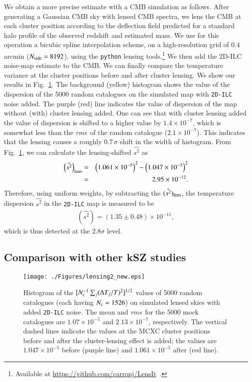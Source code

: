 \documentclass[traditabstract, longauth]{aa}
\newcommand{\1}{\'\i }
\def \rms{{\it rms}}
\begin{document}
We obtain a more precise estimate with a CMB simulation as follows.
After generating a Gaussian CMB sky with lensed CMB spectra, we lens the CMB
at each cluster position according to the deflection field predicted for a
standard halo profile \citep{Navarro96,Dodelson:2004as} of the observed redshift and
estimated mass. We use for this operation a bicubic spline
interpolation scheme, on a high-resolution grid of $0.4$ arcmin
($N_{\rm side}=8192$), using the {\tt python} lensing
tools.\footnote{Available at \url{https://github.com/carronj/LensIt}\, .}
We then add the 2D-ILC noise-map estimate to the CMB.
We can finally compare the temperature variance at the cluster positions before
and after cluster lensing. We show our results in Fig.~\ref{fig:lensing}. The
background (yellow) histogram shows the value of the dispersion of the 5000
random catalogues on the simulated map with {\tt 2D-ILC} noise added. The
purple (red) line indicates the value of dispersion of the map without (with)
cluster lensing added. One can see that with cluster lensing added the value of
dispersion is shifted to a higher value by $1.4 \times 10^{-7}$, which is
somewhat less than the \rms\ of the random catalogue
($2.1 \times 10^{-7}$). This indicates that the lensing causes a roughly
$0.7\,\sigma$ shift in the width of histogram. From Fig.~\ref{fig:lensing},
we can calculate the lensing-shifted
$\hat{s^{2}}$ as
\begin{eqnarray}
\left(\hat{s^{2}} \right)_{\rm lens} &=&\left(1.061 \times 10^{-5} \right)^{2}-\left(1.047 \times 10^{-5} \right)^{2} 
\nonumber \\
&=& 2.95 \times 10^{-12}.
\end{eqnarray} 
Therefore, using uniform weights, by subtracting the
$(\hat{s^{2}})_{\rm lens}$, the temperature dispersion $\hat{s^{2}}$ in
the {\tt 2D-ILC} map is measured to be
\begin{eqnarray}
\left(\hat{s^{2}} \right)=(1.35 \pm 0.48) \times 10^{-11},
\end{eqnarray}
which is thus detected at the $2.8\sigma$ level.


\subsection{Comparison with other kSZ studies}
\label{sec:compare}

\begin{figure}
\centering
\texttt{[image: ./Figures/lensing2\_new.eps]}
\caption[fig:lensing]{Histogram of the $[N_{\rm c}^{-1} \sum_{j}(\Delta T_{j}/T)^{2}]^{1/2}$ values of 5000 random catalogues (each having $N_{\rm c}=1526$) on simulated lensed skies with added {\tt 2D-ILC} noise. The mean and \rms\ for the 5000 mock catalogues are $1.07 \times 10^{-5}$ and $2.13 \times 10^{-7}$, respectively. The vertical dashed lines indicate the values at the MCXC cluster positions before and after the cluster-lensing effect is added; the values are $1.047 \times 10^{-5}$ before (purple line) and $1.061 \times 10^{-5}$ after (red line).}
\label{fig:lensing}
\end{figure}
\end{document}
